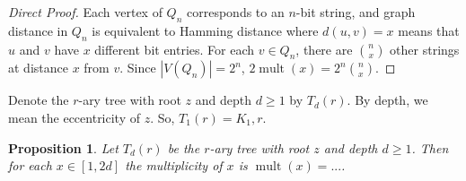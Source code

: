 \documentclass[12]{article}
\DeclareMathOperator{\mult}{mult}
\newtheorem{prop}[thm]{Proposition}
\theoremstyle{definition}
\begin{document}
	\begin{proof}[Direct Proof]
		Each vertex of $Q_n$ corresponds to an $n$-bit string, and graph distance in $Q_n$ is equivalent to Hamming distance where $d(u,v) = x$ means that $u$ and $v$ have $x$ different bit entries.  For each $v \in Q_n$, there are ${n \choose x}$ other strings at distance $x$ from $v$.  Since $|V(Q_n)| = 2^n$, $2\mult(x) = 2^n{n \choose x}$. \qedhere
	\end{proof}

	Denote the $r$-ary tree with root $z$ and depth $d \geq  1$ by $T_d(r)$.  By depth, we mean the eccentricity of $z$.  So, $T_1(r) = K_1,r$.
	
	\begin{prop}
		Let $T_d(r)$ be the $r$-ary tree with root $z$ and depth $d \geq 1$.  Then for each $x \in [1,2d]$ the multiplicity of $x$ is $\mult(x) = ...$.
	\end{prop}
\end{document}
